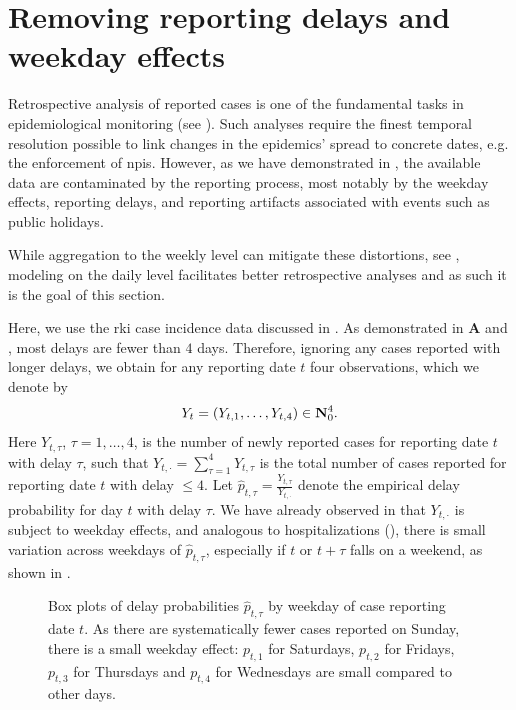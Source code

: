 \section{Removing reporting delays and weekday effects}%
\label{sec:model_reporting_delay}

Retrospective analysis of reported cases is one of the fundamental tasks in epidemiological monitoring (see ). Such analyses require the finest temporal resolution possible to link changes in the epidemics' spread to concrete dates, e.g. the enforcement of \glspl{npi}. However, as we have demonstrated in , the available data are contaminated by the reporting process, most notably by the weekday effects, reporting delays, and reporting artifacts associated with events such as public holidays.

While aggregation to the weekly level can mitigate these distortions, see , modeling on the daily level facilitates better retrospective analyses and as such it is the goal of this section.

Here, we use the \gls{rki} case incidence data discussed in . As demonstrated in  \textbf{A} and , most delays are fewer than $4$ days. Therefore, ignoring any cases reported with longer delays, we obtain for any reporting date $t$ four observations, which we denote by 
$$
    Y_{t} = \left( Y_{t, 1}, \dots, Y_{t, 4} \right) \in \mathbf N^{4}_{0}.
$$
Here $Y_{t,\tau}$, $\tau = 1, \dots, 4$, is the number of newly reported cases for reporting date $t$ with delay $\tau$, such that $Y_{t,\cdot} = \sum_{\tau = 1}^4 Y_{t, \tau}$ is the total number of cases reported for reporting date $t$ with delay $\leq 4$. 
Let $\hat p_{t, \tau} = \frac{Y_{t,\tau}}{Y_{t,\cdot}}$ denote the empirical delay probability for day $t$ with delay $\tau$. We have already observed in  that $Y_{t, \cdot}$ is subject to weekday effects, and analogous to hospitalizations (), there is small variation across weekdays of $\hat p_{t,\tau}$, especially if $t$ or $t+\tau$ falls on a weekend, as shown in . 

\begin{figure}
    \resizebox{\textwidth}{!}{%
    }
    \caption{Box plots of delay probabilities $\hat p_{t,\tau}$ by weekday of case reporting date $t$. As there are systematically fewer cases reported on Sunday, there is a small weekday effect: $p_{t,1}$ for Saturdays, $p_{t,2}$ for Fridays, $p_{t,3}$ for Thursdays and $p_{t,4}$ for Wednesdays are small compared to other days.}
    \label{fig:weekday_effect_delays}
\end{figure}

